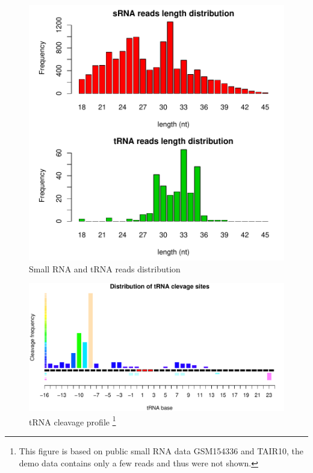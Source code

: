 \documentclass[11pt, a4paper]{article}
\begin{document}
\begin{figure}[htbp]
\begin{center}
\includegraphics[width=13cm]{distribution.pdf}
\caption{Small RNA and tRNA reads distribution}
\label{distribution}
\end{center}
\end{figure}

\begin{figure}[htbp]
\begin{center}
\includegraphics[width=13cm]{cleavage_profile.pdf}
\caption[Caption for LOF]{tRNA cleavage profile \footnote{This figure is based on public small RNA data GSM154336 and TAIR10, the demo data contains only a few reads and thus were not shown.}}
\label{cleavage}
\end{center}
\end{figure}
\end{document}
